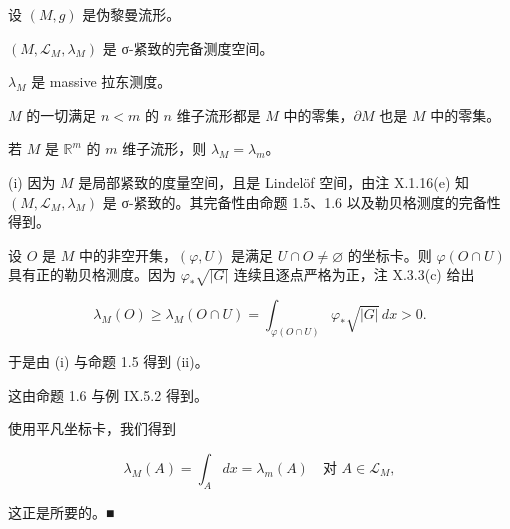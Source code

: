 \begin{theorem}

设 $ (M, g) $ 是伪黎曼流形。

\begin{subitems}
\item

$ (M, \mathcal{L}_M, \lambda_M) $ 是 σ-紧致的完备测度空间。

\item

$ \lambda_M $ 是 massive 拉东测度。

\item

$ M $ 的一切满足 $ n < m $ 的 $ n $ 维子流形都是 $ M $ 中的零集，$ \partial M $ 也是 $ M $ 中的零集。

\item

若 $ M $ 是 $ \mathbb{R}^m $ 的 $ m $ 维子流形，则 $ \lambda_M = \lambda_m $。

\proofhead
(i) 因为 $ M $ 是局部紧致的度量空间，且是 Lindelöf 空间，由注 X.1.16(e) 知 $ (M, \mathcal{L}_M, \lambda_M) $ 是 σ-紧致的。其完备性由命题 1.5、1.6 以及勒贝格测度的完备性得到。
\end{subitems}

\begin{subitems}
\item[（ii）]

设 $ O $ 是 $ M $ 中的非空开集，$ (\varphi, U) $ 是满足 $ U \cap O \ne \varnothing $ 的坐标卡。则 $ \varphi(O \cap U) $ 具有正的勒贝格测度。因为 $ \varphi_*\sqrt{|G|} $ 连续且逐点严格为正，注 X.3.3(c) 给出

\[
\lambda_M(O) \ge \lambda_M(O \cap U) = \int_{\varphi(O \cap U)} \varphi_*\sqrt{|G|} \, dx > 0 .
\]

于是由 (i) 与命题 1.5 得到 (ii)。

\item[（iii）]

这由命题 1.6 与例 IX.5.2 得到。

\item[（iv）]

使用平凡坐标卡，我们得到

\[
\lambda_M(A) = \int_A dx = \lambda_m(A) \quad \text{对 } A \in \mathcal{L}_M ,
\]

这正是所要的。\nobreak\hspace{0.35em}■

\end{subitems}

\end{theorem}

